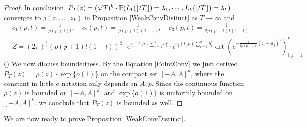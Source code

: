 \begin{proof}
In conclusion, $P_{T}(z)=(\sqrt{T})^{k}\cdot\mathbb{P}(L_1(\lfloor tT\rfloor)=\lambda_1,\cdots, L_k(\lfloor tT\rfloor)=\lambda_k)$ converges to $\rho(z_{1},\dots,z_{k})$ in Proposition \ref{WeakConvDistinct} as $T\rightarrow\infty$ and 
\begin{align*}
	&c_{1}(p,t)=\frac{1}{p(p+1)t}, \quad c_{2}(p,t)=\frac{1}{p(p+1)(1-t)}, \quad c_{3}(p,t)=\frac{1}{2p(p+1)t(1-t)}\\
	&Z=(2\pi)^{\frac{k}{2}}(p(p+1)t(1-t))^{\frac{k}{2}}\cdot e^{c_{1}(t,p)\sum_{i=1}^{k}a_{i}^{2}}\cdot e^{c_{2}(t,p)\sum_{i=1}^{k}b_{i}^{2}}\det\left(e^{-\frac{1}{2p(p+1)}(b_{i}-a_{j})^{2}}\right)_{i,j=1}^{k}
\end{align*}
() We now discuss boundedness. By the Equation \ref{PointConv} we just derived, $P_{T}(z)=\rho(z)\cdot\exp\{o(1)\}$ on the compact set $[-A,A]^{k}$, where the constant in little $o$ notation only depends on $A,p$. Since the continuous function $\rho(z)$ is bounded on $[-A,A]^{k}$, and $\exp\{o(1)\}$ is uniformly bounded on $[-A,A]^{k}$, we conclude that $P_{T}(z)$ is bounded as well.
\end{proof}
We are now ready to prove Proposition \ref{WeakConvDistinct}.
